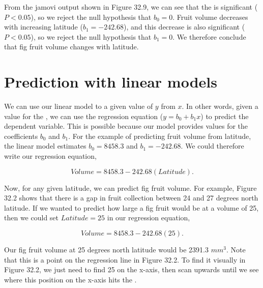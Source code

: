 \documentclass[
  openany]{krantz}
\begin{document}
From the jamovi output shown in Figure 32.9, we can see that the  is significant (\(P < 0.05\)), so we reject the null hypothesis that \(b_{0} = 0\).
Fruit volume decreases with increasing latitude (\(b_{1} = -242.68\)), and this decrease is also significant (\(P < 0.05\)), so we reject the null hypothesis that \(b_{1} = 0\).
We therefore conclude that fig fruit volume changes with latitude.

\hypertarget{prediction-with-linear-models}{%
\section{Prediction with linear models}\label{prediction-with-linear-models}}

We can use our linear model to  a given value of \(y\) from \(x\).
In other words, given a value for the , we can use the regression equation (\(y = b_{0} + b_{1}x\)) to predict the dependent variable.
This is possible because our model provides values for the coefficients \(b_{0}\) and \(b_{1}\).
For the example of predicting fruit volume from latitude, the linear model estimates \(b_{0} = 8458.3\) and \(b_{1} = -242.68\).
We could therefore write our regression equation,

\[Volume = 8458.3 - 242.68(Latitude).\]

Now, for any given latitude, we can predict fig fruit volume.
For example, Figure 32.2 shows that there is a gap in fruit collection between 24 and 27 degrees north latitude.
If we wanted to predict how large a fig fruit would be at a volume of 25, then we could set \(Latitude = 25\) in our regression equation,

\[Volume = 8458.3 - 242.68(25).\]

Our  fig fruit volume at 25 degrees north latitude would be 2391.3 \(mm^{3}\).
Note that this is a point on the regression line in Figure 32.2.
To find it visually in Figure 32.2, we just need to find 25 on the x-axis, then scan upwards until we see where this position on the x-axis hits the .
\end{document}
